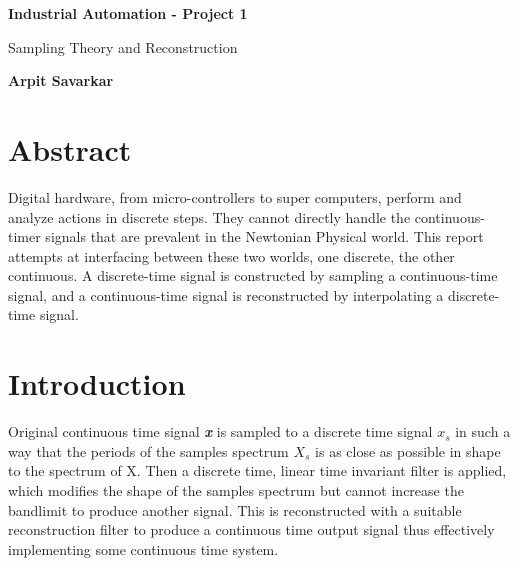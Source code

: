 \documentclass{article}
\begin{document}
\begin{titlepage}
   \begin{center}
      \vspace*{1cm}

       \textbf{Industrial Automation - Project 1}

      \vspace{0.5cm}
        Sampling Theory and Reconstruction
            
       \vspace{1.5cm}

       \textbf{Arpit Savarkar}
        
            
            
   \end{center}
\end{titlepage}

\section{Abstract}
Digital hardware, from micro-controllers to super computers, perform and analyze actions in discrete steps. They cannot directly handle the continuous-timer signals that are prevalent in the Newtonian Physical world. This report attempts at interfacing between these two worlds, one discrete, the other continuous. A discrete-time signal is constructed by sampling a continuous-time signal, and a continuous-time signal is reconstructed by interpolating a discrete-time signal. \cite{b7}


\section{Introduction}
Original continuous time signal \textit{\textbf{x}} is sampled to a discrete time signal $ x_s $ in such a way that the periods of the samples spectrum $ X_s $ is as close as possible in shape to the spectrum of X. Then a discrete time, linear time invariant filter is applied, which modifies the shape of the samples spectrum but cannot increase the bandlimit to produce another signal. This is reconstructed with a suitable reconstruction filter to produce a continuous time output signal thus effectively implementing some continuous time system. 
\end{document}
